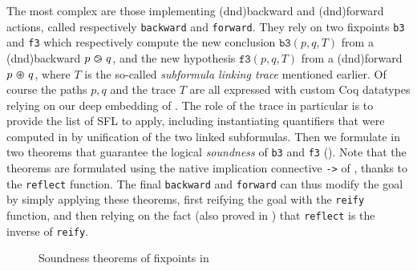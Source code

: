 The most complex  are those implementing \kl(dnd){backward} and \kl(dnd){forward} 
actions, called respectively \texttt{backward} and \texttt{forward}. They rely
on two  fixpoints \texttt{b3} and \texttt{f3} which respectively compute the
new conclusion $\mathtt{b3}(p, q, T)$ from a \kl(dnd){backward}  $p \operatorname{\,\varogreaterthan\,} q$, and
the new hypothesis $\mathtt{f3}(p, q, T)$ from a \kl(dnd){forward}  $p \operatorname{\,\varoast\,} q$,
where $T$ is the so-called \emph{subformula linking trace} mentioned earlier. Of
course the paths $p, q$ and the trace $T$ are all expressed with custom Coq
datatypes relying on our deep embedding of . The role of the
trace in particular is to provide the list of SFL  to apply,
including   instantiating quantifiers that were computed in  by
unification of the two linked subformulas. Then we formulate in  two theorems
that guarantee the logical \emph{soundness} of \texttt{b3} and \texttt{f3}
(). Note that the theorems are formulated using the native
implication connective \texttt{->} of , thanks to the \texttt{reflect}
function. The final  \texttt{backward} and \texttt{forward} can thus
modify the goal by simply applying these theorems, first reifying the goal with
the \texttt{reify} function, and then relying on the fact (also proved in )
that \texttt{reflect} is the inverse of \texttt{reify}.

\begin{figure}
  
  \caption{Soundness theorems of  fixpoints in }
\end{figure}


